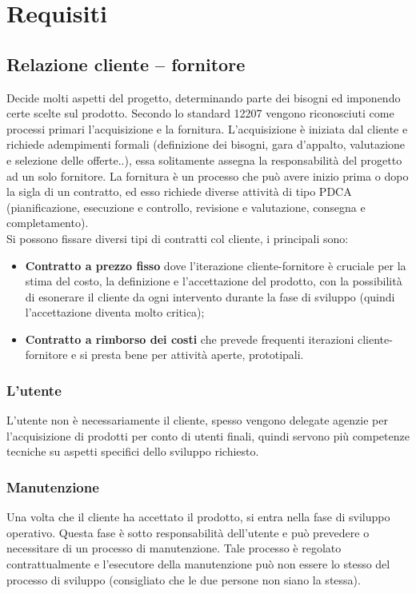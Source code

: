 \section{Requisiti}

\subsection{Relazione cliente – fornitore}
Decide molti aspetti del progetto, determinando parte dei bisogni ed imponendo certe scelte sul prodotto. 
Secondo lo standard 12207 vengono riconosciuti come processi primari l'acquisizione e la fornitura. 
L'acquisizione è iniziata dal cliente e richiede adempimenti formali (definizione dei bisogni, gara d'appalto, valutazione e selezione delle offerte..), essa solitamente assegna la responsabilità del progetto ad un solo fornitore. 
La fornitura è un processo che può avere inizio prima o dopo la sigla di un contratto, ed esso richiede diverse attività di tipo PDCA (pianificazione, esecuzione e controllo, revisione e valutazione, consegna e completamento).\\
Si possono fissare diversi tipi di contratti col cliente, i principali sono:
\begin{itemize}
\item \textbf{Contratto a prezzo fisso} dove l'iterazione cliente-fornitore è cruciale per la stima del costo, la definizione e l'accettazione del prodotto, con la possibilità di esonerare il cliente da ogni intervento durante la fase di sviluppo (quindi l'accettazione diventa molto critica);
\item \textbf{Contratto a rimborso dei costi} che prevede frequenti iterazioni cliente-fornitore e si presta bene per attività aperte, prototipali.
\end{itemize}

\subsubsection{L'utente}
L'utente non è necessariamente il cliente, spesso vengono delegate agenzie per l'acquisizione di prodotti per conto di utenti finali, quindi servono più competenze tecniche su aspetti specifici dello sviluppo richiesto.

\subsubsection{Manutenzione}
Una volta che il cliente ha accettato il prodotto, si entra nella fase di sviluppo operativo. 
Questa fase è sotto responsabilità dell'utente e può prevedere o necessitare di un processo di manutenzione.
Tale processo è regolato contrattualmente e l'esecutore della manutenzione può non essere lo stesso del processo di sviluppo (consigliato che le due persone non siano la stessa).

